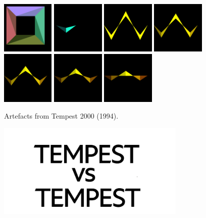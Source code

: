 \begin{figure}[H]
\includegraphics[width=2.5cm]{preface/obj2d/obj_31.png}
\includegraphics[width=2.5cm]{preface/obj2d/obj_4.png}
\includegraphics[width=2.5cm]{preface/obj2d/obj_5.png}
\includegraphics[width=2.5cm]{preface/obj2d/obj_6.png}
\includegraphics[width=2.5cm]{preface/obj2d/obj_7.png}
\includegraphics[width=2.5cm]{preface/obj2d/obj_8.png}
\includegraphics[width=2.5cm]{preface/obj2d/obj_9.png}
  \caption*{Artefacts from Tempest 2000 (1994).}
\end{figure}
\vspace*{\fill}
\thispagestyle{empty}%
\clearpage
\vspace*{\fill}
\begin{figure}[H]
    \centering
      \includegraphics[width=9cm]{src/cover/title_page.png}%
\end{figure}
\vspace*{\fill}
\thispagestyle{empty}%
\clearpage %

